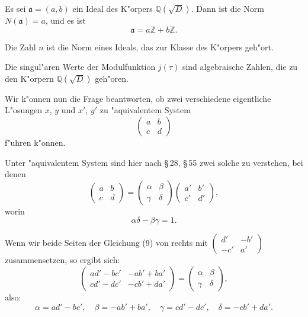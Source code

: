 \documentclass[11pt,a4paper]{article}
\theoremstyle{plain}
\newcommand{\sect}[1]{\S\,#1}
\begin{document}
\smallskip

Es sei $\mathfrak{a} = (a, b)$ ein Ideal des K"{o}rpers $\mathbb{Q}(\sqrt{D})$. Dann ist die Norm $N(\mathfrak{a}) = a$, und es ist
\[
\mathfrak{a} = a\mathbb{Z} + b\mathbb{Z}.
\]

Die Zahl $n$ ist die Norm eines Ideals, das zur Klasse des K"{o}rpers geh"{o}rt.

\smallskip

Die singul"{a}ren Werte der Modulfunktion $j(\tau)$ sind algebraische Zahlen, die zu den K"{o}rpern $\mathbb{Q}(\sqrt{D})$ geh"{o}ren.

\newpage
\setcounter{page}{417}

Wir k"{o}nnen nun die Frage beantworten, ob zwei verschiedene eigentliche L"{o}sungen $x$, $y$ und $x'$, $y'$ zu "{a}quivalentem System
\[
\begin{pmatrix} a & b\\ c & d \end{pmatrix}
\]
f"{u}hren k"{o}nnen.

Unter "{a}quivalentem System sind hier nach \sect{28}, \sect{55} zwei solche zu verstehen, bei denen
\begin{equation}
\label{eq:114_9}
\begin{pmatrix} a & b\\ c & d \end{pmatrix} = \begin{pmatrix} \alpha & \beta\\ \gamma & \delta \end{pmatrix} \begin{pmatrix} a' & b'\\ c' & d' \end{pmatrix},
\end{equation}
worin
\begin{equation}
\label{eq:114_10}
\alpha\delta - \beta\gamma = 1.
\end{equation}

Wenn wir beide Seiten der Gleichung (9) von rechts mit $\begin{pmatrix} d' & -b'\\ -c' & a' \end{pmatrix}$ zusammensetzen, so ergibt sich:
\[
\begin{pmatrix} ad' - bc' & -ab' + ba'\\ cd' - dc' & -cb' + da' \end{pmatrix} = \begin{pmatrix} \alpha & \beta\\ \gamma & \delta \end{pmatrix},
\]
also:
\[
\alpha = ad' - bc', \quad \beta = -ab' + ba', \quad \gamma = cd' - dc', \quad \delta = -cb' + da'.
\]
\end{document}
